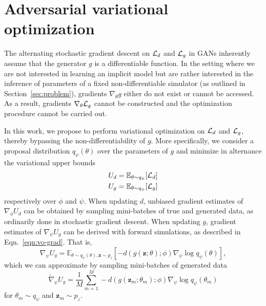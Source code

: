 \documentclass[twocolumn,superscriptaddress,aps]{revtex4-1}
\theoremstyle{plain}
\begin{document}

\section{Adversarial variational optimization}

The alternating stochastic gradient descent on ${\cal L}_d$ and ${\cal L}_g$ in
GANs inherently assume that the generator $g$ is a differentiable function. In
the setting where we are not interested in learning an implicit model but are
rather interested in the inference of parameters of a fixed
non-differentiable simulator (as outlined in Section~\ref{sec:problem}),
gradients $\nabla_\theta g$ either do not exist or cannot be accessed. As a
result, gradients $\nabla_\theta {\cal L}_g$ cannot be constructed and the
optimization procedure cannot be carried out.

In this work, we propose to perform variational optimization
on ${\cal L}_d$ and ${\cal L}_g$, thereby bypassing the non-differentiability
of $g$. More specifically, we consider a proposal distribution $q_\psi(\theta)$
over the parameters of $g$ and minimize in alternance the variational upper bounds
\begin{align}
    U_d &= \mathbb{E}_{\theta \sim q_\psi} [ {\cal L}_d ] \label{eqn:vo-ud} \\
    U_g &= \mathbb{E}_{\theta \sim q_\psi} [ {\cal L}_g ] \label{eqn:vo-ug}
\end{align}
respectively over $\phi$ and $\psi$.
When updating $d$, unbiased gradient estimates of $\nabla_\phi U_d$ can be
obtained by sampling mini-batches of true and generated data, as ordinarily
done in stochastic gradient descent. When updating $g$, gradient estimates
of $\nabla_\psi U_g$ can be derived with forward simulations, as described in Eqn.~\ref{eqn:vo-grad}.
That is,
\begin{equation}
    \nabla_\psi U_g = \mathbb{E}_{\theta \sim q_\psi(\theta), \mathbf{z} \sim p_z}  [-d(g(\mathbf{z};\theta);\phi) \nabla_\psi \log q_\psi(\theta)],
\end{equation}
which we can approximate by sampling mini-batches of generated data
\begin{equation}
    \tilde{\nabla}_\psi U_g = \frac{1}{M} \sum_{m=1}^M -d(g(\mathbf{z}_m; \theta_m); \phi) \nabla_\psi \log q_\psi(\theta_m)
\end{equation}
for $\theta_m \sim q_\psi$ and $\mathbf{z}_m \sim p_z$.
\end{document}
